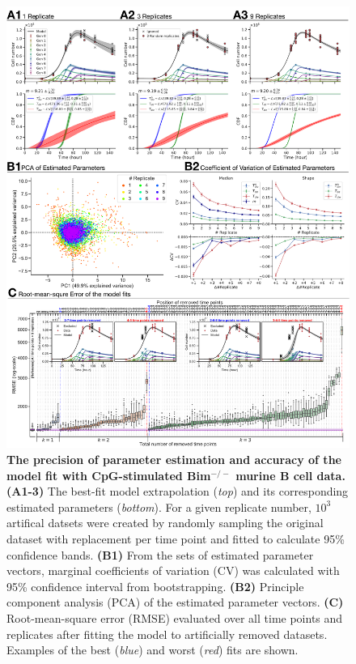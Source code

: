 \documentclass[11pt, a4paper]{article}
\begin{document}
\begin{figure}[h]
    \centering
    \includegraphics[scale=0.58]{figs/fig5.pdf}
    \caption{\textbf{The precision of parameter estimation and accuracy of the model fit with CpG-stimulated Bim$^{-/-}$ murine B cell data.} \textbf{(A1-3)} The best-fit model extrapolation (\textit{top}) and its corresponding estimated parameters (\textit{bottom}). For a given replicate number, $10^3$ artifical datsets were created by randomly sampling the original dataset with replacement per time point and fitted to calculate 95\% confidence bands. \textbf{(B1)} From the sets of estimated parameter vectors, marginal coefficients of variation (CV) was calculated with 95\% confidence interval from bootstrapping. \textbf{(B2)} Principle component analysis (PCA) of the estimated parameter vectors. \textbf{(C)} Root-mean-square error (RMSE) evaluated over all time points and replicates after fitting the model to artificially removed datasets. Examples of the best (\textit{blue}) and worst (\textit{red}) fits are shown.}
    \label{fig:Bcell_application}
\end{figure}
\clearpage
\end{document}
